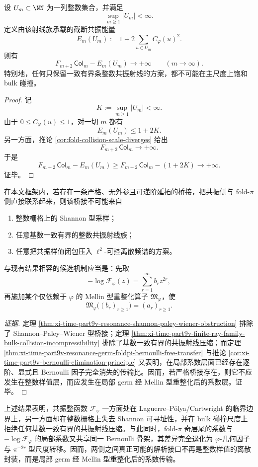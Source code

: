 \begin{theorem}\label{thm:xi-time-part9v-finite-ray-family-bulk-collision-incompressibility}
设 \(U_m\subset\NN\) 为一列整数集合，并满足
\[
\sup_{m\ge 1}|U_m|<\infty.
\]
定义由该射线族承载的截断共振能量
\[
E_m(U_m):=1+2\sum_{u\in U_m}C_\varphi(u)^2.
\]
则有
\[
F_{m+2}\,\mathsf{Col}_m-E_m(U_m)\longrightarrow +\infty
\qquad (m\to\infty).
\]
特别地，任何只保留一致有界条整数共振射线的方案，都不可能在主尺度上饱和 bulk 碰撞。
\end{theorem}
\begin{proof}
记
\[
K:=\sup_{m\ge 1}|U_m|<\infty.
\]
由于 \(0\le C_\varphi(u)\le 1\)，对一切 \(m\) 都有
\[
E_m(U_m)\le 1+2K.
\]
另一方面，推论 \ref{cor:fold-collision-scale-diverges} 给出
\[
F_{m+2}\,\mathsf{Col}_m\longrightarrow +\infty.
\]
于是
\[
F_{m+2}\,\mathsf{Col}_m-E_m(U_m)
\ge
F_{m+2}\,\mathsf{Col}_m-(1+2K)
\longrightarrow +\infty.
\]
证毕。
\end{proof}

\begin{conjecture}\label{conj:xi-time-part9v-resonance-germ-mellin-unique-bridge}
在本文框架内，若存在一条严格、无外参且可递阶延拓的桥接，把共振侧与 fold-\(\pi\) 侧直接联系起来，则该桥接不可能来自
\begin{enumerate}
  \item 整数栅格上的 Shannon 型采样；
  \item 任意基数一致有界的整数共振射线族；
  \item 任意把共振样值闭包压入 \(\ell^2\)-可控离散频谱的方案。
\end{enumerate}
与现有结果相容的候选机制应当是：先取
\[
-\log \mathcal F_\varphi(z)=\sum_{r=1}^{\infty}b_r z^{2r},
\]
再施加某个仅依赖于 \(\varphi\) 的 Mellin 型重整化算子 \(\mathfrak M_\varphi\)，使
\[
\mathfrak M_\varphi\bigl((b_r)_{r\ge 1}\bigr)
=
(a_r)_{r\ge 1}.
\]
\end{conjecture}
\begin{proof}[证据]
定理 \ref{thm:xi-time-part9v-resonance-shannon-paley-wiener-obstruction} 排除了 Shannon--Paley--Wiener 型桥接；定理 \ref{thm:xi-time-part9v-finite-ray-family-bulk-collision-incompressibility} 排除了基数一致有界的共振射线压缩；而定理 \ref{thm:xi-time-part9v-resonance-germ-foldpi-bernoulli-free-transfer} 与推论 \ref{cor:xi-time-part9v-bernoulli-elimination-principle} 又表明，在局部系数层面已经存在逐阶、显式且 Bernoulli 因子完全消失的传输比。因而，若严格桥接存在，则它不应发生在整数样值层，而应发生在局部 germ 经 Mellin 型重整化后的系数层。证毕。
\end{proof}

\noindent
上述结果表明，共振整函数 \(\mathcal F_\varphi\) 一方面处在 Laguerre--P\'olya/Cartwright 的临界边界上，另一方面却在整数栅格上失去 Shannon 可寻址性，并在 bulk 碰撞尺度上拒绝任何基数一致有界的共振射线压缩。与此同时，fold-\(\pi\) 奇层尾的系数与 \(-\log \mathcal F_\varphi\) 的局部系数又共享同一 Bernoulli 骨架，其差异完全退化为 \(\varphi\)-几何因子与 \(\pi^{-2r}\) 型尺度转移。因而，两侧之间真正可能的解析接口不再是整数样值的离散封装，而是局部 germ 经 Mellin 型重整化后的系数传输。

\endinput

